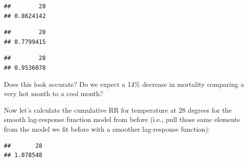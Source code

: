 \documentclass[
]{book}
\newenvironment{Shaded}{\begin{snugshade}}{\end{snugshade}}
\newcommand{\DecValTok}[1]{\textcolor[rgb]{0.00,0.00,0.81}{#1}}
\newcommand{\NormalTok}[1]{#1}
\newcommand{\SpecialCharTok}[1]{\textcolor[rgb]{0.81,0.36,0.00}{\textbf{#1}}}
\begin{document}
\begin{verbatim}
##        28 
## 0.8624142
\end{verbatim}

\begin{Shaded}
\end{Shaded}

\begin{verbatim}
##        28 
## 0.7799415
\end{verbatim}

\begin{Shaded}
\end{Shaded}

\begin{verbatim}
##        28 
## 0.9536078
\end{verbatim}

Does this look accurate? Do we expect a 14\% decrease in mortality comparing a very hot month to a cool month?

Now let's calculate the cumulative RR for temperature at 28 degrees for the smooth lag-response function model from before (i.e., pull those same elements from the model we fit before
with a smoother lag-response function):

\begin{Shaded}
\end{Shaded}

\begin{verbatim}
##       28 
## 1.078548
\end{verbatim}

\begin{Shaded}
\end{Shaded}
\end{document}
